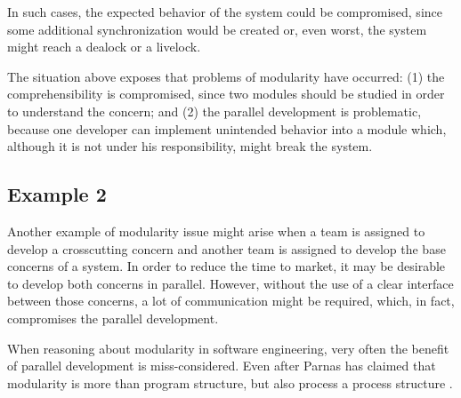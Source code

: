 In such cases, the expected behavior of the system could be
compromised, since some additional synchronization would be created
or, even worst, the system might reach a dealock or a livelock.

The situation above exposes that problems of modularity have
occurred: (1) the comprehensibility is compromised, since two
modules should be studied in order to understand the concern; and
(2) the parallel development is problematic, because one developer
can implement unintended behavior into a module which, although it
is not under his responsibility, might break the system.

%
%
%

\subsection{Example 2}

Another example of modularity issue might arise when a team is assigned to develop a crosscutting concern and another team is assigned to develop the base concerns of a system. In order to reduce the time to market, it may be desirable to develop both concerns in parallel. However, without the use of a clear interface between those concerns, a lot of communication might be required, which, in fact, compromises the parallel development. 

When reasoning about modularity in software engineering, very often the benefit of parallel development is miss-considered. Even after Parnas has claimed that modularity is more than program structure, but also process a process structure \cite{}.



